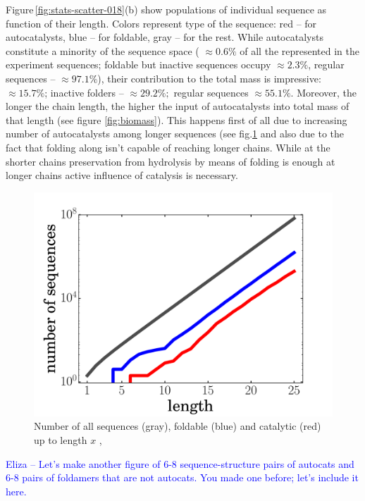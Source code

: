 \documentclass[journal=jacsat,manuscript=article,layout=twocolumn]{achemso}
\newcommand*{\blue}[1]{\textcolor{blue}{#1}}
\begin{document}
Figure\,\ref{fig:stats-scatter-018}(b) show populations of individual sequence as function of their 
length. Colors represent type of the sequence: red -- for autocatalysts, blue -- for foldable, gray 
-- for the rest. While autocatalysts constitute a minority of the sequence space ( $\approx 0.6\%$ 
of all the represented in the experiment sequences; foldable but inactive sequences occupy $\approx 
2.3\%$, regular sequences -- $\approx97.1\%$), their contribution to the total mass is impressive: 
$\approx 15.7\%$; inactive folders -- $\approx 29.2\%;$ regular sequences $\approx 55.1\%$. 
Moreover, the longer the chain length, the higher the input of autocatalysts into total mass of 
that length (see figure \ref{fig:biomass}). This happens first of all due to increasing number of 
autocatalysts among longer sequences (see fig.\ref{fig:hp-statistics} and also due to the fact that 
folding along isn't capable of reaching longer chains. While at the shorter chains preservation 
from hydrolysis by means of folding is enough at longer chains active influence of catalysis is 
necessary.
\begin{figure}[hbt!]
  \centering
  \includegraphics[width=\columnwidth]{pictures/hp-statistics.pdf} 
  \caption{\footnotesize{Number of all sequences (gray), foldable (blue) and catalytic (red) up to 
length $x$ , }}
  \label{fig:hp-statistics}
\end{figure}

\blue{Eliza -- Let's make another figure of 6-8 sequence-structure pairs of autocats and 6-8 pairs 
of 
foldamers that are not autocats.  You made one before; let's include it here.}
\end{document}
